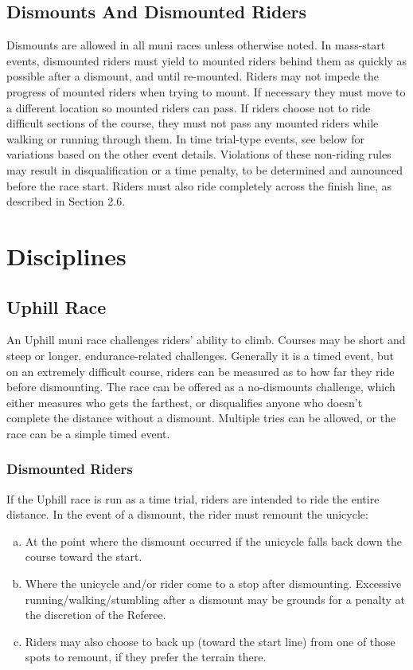 \subsection{Dismounts And Dismounted Riders}
\label{sec:muni-dismounts}
Dismounts are allowed in all muni races unless otherwise noted. In mass-start
events, dismounted riders must yield to mounted riders behind them as quickly as
possible after a dismount, and until re-mounted. Riders may not impede the
progress of mounted riders when trying to mount. If necessary they must move to
a different location so mounted riders can pass. If riders choose not to ride
difficult sections of the course, they must not pass any mounted riders while
walking or running through them. In time trial-type events, see below for
variations based on the other event details. Violations of these non-riding
rules may result in disqualification or a time penalty, to be determined and
announced before the race start. Riders must also ride completely across the
finish line, as described in Section 2.6. %


\section{Disciplines}
\label{sec:muni-disciplines}

\subsection{Uphill Race}
\label{sec:muni-uphill}
An Uphill muni race challenges riders' ability to climb. Courses may be short
and steep or longer, endurance-related challenges. Generally it is a timed
event, but on an extremely difficult course, riders can be measured as to how
far they ride before dismounting. The race can be offered as a no-dismounts
challenge, which either measures who gets the farthest, or disqualifies anyone
who doesn't complete the distance without a dismount. Multiple tries can be
allowed, or the race can be a simple timed event.

\subsubsection{Dismounted Riders}
If the Uphill race is run as a time trial, riders are intended to ride the
entire distance. In the event of a dismount, the rider must remount the
unicycle:

\begin{enumerate}[(a)]
\item At the point where the dismount occurred if the unicycle falls back down
      the course toward the start. 
\item Where the unicycle and/or rider come to a stop after dismounting.
      Excessive running/walking/stumbling after a dismount may be grounds for a
      penalty at the discretion of the Referee. 
\item Riders may also choose to back up (toward the start line) from one of
      those spots to remount, if they prefer the terrain there.
\end{enumerate}


